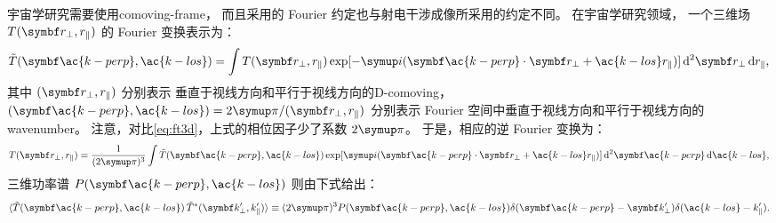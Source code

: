 宇宙学研究需要使用\ac{comoving-frame}，
而且采用的 Fourier 约定也与射电干涉成像所采用的约定不同。
在宇宙学研究领域，
一个三维场 $T(\B{r}_{\perp}, r_{\parallel})$ 的 Fourier 变换表示为：
\begin{equation}
  \label{eq:ft3d-k}
  \tilde{T}(\B{\ac{k-perp}}, \ac{k-los}) =
    \int T(\B{r}_{\perp}, r_{\parallel})
    \exp[ -\Ci (\B{\ac{k-perp}} \cdot \B{r}_{\perp}
      + \ac{k-los} r_{\parallel}) ]
    \,\mathrm{d}^2\B{r}_{\perp} \,\D{r_{\parallel}} ,
\end{equation}
其中 $(\B{r}_{\perp}, r_{\parallel})$ 分别表示
垂直于视线方向和平行于视线方向的\acl{D-comoving}，
$(\B{\ac{k-perp}}, \ac{k-los}) = 2\Cpi / (\B{r}_{\perp}, r_{\parallel})$
分别表示 Fourier 空间中垂直于视线方向和平行于视线方向的\ac{wavenumber}。
注意，对比\autoref{eq:ft3d}，上式的相位因子少了系数 $2\Cpi$。
于是，相应的逆 Fourier 变换为：
\begin{equation}
  T(\B{r}_{\perp}, r_{\parallel}) =
    \frac{1}{(2\Cpi)^3} \int \tilde{T}(\B{\ac{k-perp}}, \ac{k-los})
    \exp[ \Ci (\B{\ac{k-perp}} \cdot \B{r}_{\perp}
      + \ac{k-los} r_{\parallel}) ]
    \,\mathrm{d}^2\B{\ac{k-perp}} \,\D{\ac{k-los}} ,
\end{equation}
三维功率谱 $P(\B{\ac{k-perp}}, \ac{k-los})$ 则由下式给出：
\begin{equation}
  \label{eq:ps3d-k}
  \langle \tilde{T}(\B{\ac{k-perp}}, \ac{k-los})
      \, \tilde{T}^*(\B{k}'_{\perp}, k'_{\parallel}) \rangle
    \equiv (2\Cpi)^3 P(\B{\ac{k-perp}}, \ac{k-los})
      \delta(\B{\ac{k-perp}} - \B{k}'_{\perp})
      \delta(\ac{k-los} - k'_{\parallel}) .
\end{equation}

